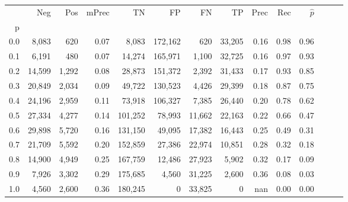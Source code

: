 \begin{tabular}{rrrrrrrrrrrrrr}
\toprule
{} &     Neg &    Pos & mPrec &       TN &       FP &      FN &      TP &  Prec &   Rec & $\hat{p}$ \\
p   &         &        &       &          &          &         &         &       &       &           \\
\midrule
0.0 &   8,083 &    620 &  0.07 &    8,083 &  172,162 &     620 &  33,205 &  0.16 &  0.98 &      0.96 \\
0.1 &   6,191 &    480 &  0.07 &   14,274 &  165,971 &   1,100 &  32,725 &  0.16 &  0.97 &      0.93 \\
0.2 &  14,599 &  1,292 &  0.08 &   28,873 &  151,372 &   2,392 &  31,433 &  0.17 &  0.93 &      0.85 \\
0.3 &  20,849 &  2,034 &  0.09 &   49,722 &  130,523 &   4,426 &  29,399 &  0.18 &  0.87 &      0.75 \\
0.4 &  24,196 &  2,959 &  0.11 &   73,918 &  106,327 &   7,385 &  26,440 &  0.20 &  0.78 &      0.62 \\
0.5 &  27,334 &  4,277 &  0.14 &  101,252 &   78,993 &  11,662 &  22,163 &  0.22 &  0.66 &      0.47 \\
0.6 &  29,898 &  5,720 &  0.16 &  131,150 &   49,095 &  17,382 &  16,443 &  0.25 &  0.49 &      0.31 \\
0.7 &  21,709 &  5,592 &  0.20 &  152,859 &   27,386 &  22,974 &  10,851 &  0.28 &  0.32 &      0.18 \\
0.8 &  14,900 &  4,949 &  0.25 &  167,759 &   12,486 &  27,923 &   5,902 &  0.32 &  0.17 &      0.09 \\
0.9 &   7,926 &  3,302 &  0.29 &  175,685 &    4,560 &  31,225 &   2,600 &  0.36 &  0.08 &      0.03 \\
1.0 &   4,560 &  2,600 &  0.36 &  180,245 &        0 &  33,825 &       0 &   nan &  0.00 &      0.00 \\
\bottomrule
\end{tabular}

